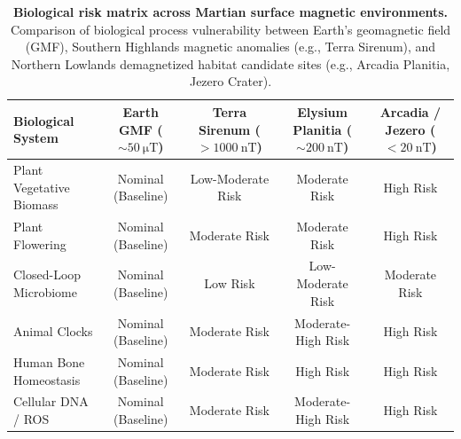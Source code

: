 \begin{table}[t]
\centering
\footnotesize
\caption{\textbf{Biological risk matrix across Martian surface magnetic environments.} Comparison of biological process vulnerability between Earth's geomagnetic field (GMF), Southern Highlands magnetic anomalies (e.g., Terra Sirenum), and Northern Lowlands demagnetized habitat candidate sites (e.g., Arcadia Planitia, Jezero Crater).}
\label{tab:mars_risk_matrix}
\begin{tabular}{p{3.6cm}cccc}
\toprule
\textbf{Biological System} & \textbf{Earth GMF ($\sim\SI{50}{\micro\tesla}$)} & \textbf{Terra Sirenum ($>\SI{1000}{\nano\tesla}$)} & \textbf{Elysium Planitia ($\sim\SI{200}{\nano\tesla}$)} & \textbf{Arcadia / Jezero ($<\SI{20}{\nano\tesla}$)} \\
\midrule
Plant Vegetative Biomass & Nominal (Baseline) & Low-Moderate Risk & Moderate Risk & High Risk \\
Plant Flowering & Nominal (Baseline) & Moderate Risk & Moderate Risk & High Risk \\
Closed-Loop Microbiome & Nominal (Baseline) & Low Risk & Low-Moderate Risk & Moderate Risk \\
Animal Clocks & Nominal (Baseline) & Moderate Risk & Moderate-High Risk & High Risk \\
Human Bone Homeostasis & Nominal (Baseline) & Moderate Risk & High Risk & High Risk \\
Cellular DNA / ROS & Nominal (Baseline) & Moderate Risk & Moderate-High Risk & High Risk \\
\bottomrule
\end{tabular}
\end{table}
